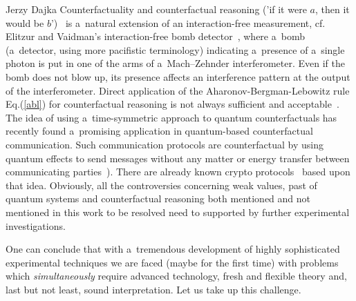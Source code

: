 \begin{artengenv}{Jerzy Dajka}
Counterfactuality and counterfactual reasoning ('if it were $a$, then it would be $b$')~\parencite{kont_book,kont0}  is a~natural  extension of an interaction-free measurement, cf. Elitzur
and Vaidman’s interaction-free bomb detector~\parencite{bomb}, where a~bomb (a~detector, using more pacifistic terminology) indicating a~presence of a~single photon is put in
one of the arms of a~Mach–Zehnder interferometer. Even if the
bomb does not blow up, its  presence  affects an interference pattern  at the output of the interferometer.  Direct application of the Aharonov-Bergman-Lebowitz rule Eq.(\ref{abl}) for counterfactual reasoning is not always sufficient and acceptable~\parencite{kont0}. The idea of using a~time-symmetric approach to quantum counterfactuals has  recently  found a~promising application in quantum-based counterfactual communication. Such communication protocols are counterfactual by using quantum effects to send
messages without any matter or energy transfer between communicating
parties~\parencite{kont1,kont2}). There are already known crypto protocols~\parencite{kont_crypto, kont_crypto0,kont_crypto1,kont_crypto1,kont_crypto2} based upon that idea.
Obviously, all the controversies concerning weak values, past of quantum systems and counterfactual reasoning both mentioned and not mentioned in this work to be resolved need to supported by further experimental investigations. 

One can conclude that with a~tremendous development of highly sophisticated  experimental techniques we are faced (maybe for the first time) with problems which {\it simultaneously} require advanced technology, fresh and flexible theory and, last but not least, sound interpretation. Let us take up this challenge.    
 

\end{artengenv}
